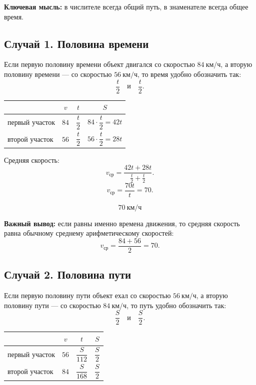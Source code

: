 \documentclass[a4paper,12pt]{article}
\newcommand{\important}[1]{\textcolor{darkaccent}{\textbf{#1}}}
\newcommand{\kmh}{\text{км/ч}}
\begin{document}
\important{Ключевая мысль:} в числителе всегда общий путь, в знаменателе всегда общее время.

\subsection{Случай 1. Половина времени}

Если первую половину времени объект двигался со скоростью $84\ \kmh$, а вторую половину времени --- со скоростью $56\ \kmh$, то время удобно обозначить так:
\[
\frac{t}{2} \quad \text{и} \quad \frac{t}{2}.
\]

\begin{center}
\renewcommand{\arraystretch}{1.35}
\begin{tabularx}{0.82\linewidth}{X c c c}
\toprule
 & $v$ & $t$ & $S$ \\
\midrule
первый участок & $84$ & $\dfrac{t}{2}$ & $84\cdot\dfrac{t}{2}=42t$ \\
второй участок & $56$ & $\dfrac{t}{2}$ & $56\cdot\dfrac{t}{2}=28t$ \\
\bottomrule
\end{tabularx}
\end{center}

Средняя скорость:
\[
v_{\text{ср}}=\frac{42t+28t}{\frac{t}{2}+\frac{t}{2}}.
\]
\[
v_{\text{ср}}=\frac{70t}{t}=70.
\]

\[
\boxed{70\ \kmh}
\]

\important{Важный вывод:} если равны именно времена движения, то средняя скорость равна обычному среднему арифметическому скоростей:
\[
v_{\text{ср}}=\frac{84+56}{2}=70.
\]

\subsection{Случай 2. Половина пути}

Если первую половину пути объект ехал со скоростью $56\ \kmh$, а вторую половину пути --- со скоростью $84\ \kmh$, то путь удобно обозначить так:
\[
\frac{S}{2} \quad \text{и} \quad \frac{S}{2}.
\]

\begin{center}
\renewcommand{\arraystretch}{1.35}
\begin{tabularx}{0.82\linewidth}{X c c c}
\toprule
 & $v$ & $t$ & $S$ \\
\midrule
первый участок & $56$ & $\dfrac{S}{112}$ & $\dfrac{S}{2}$ \\
второй участок & $84$ & $\dfrac{S}{168}$ & $\dfrac{S}{2}$ \\
\bottomrule
\end{tabularx}
\end{center}
\end{document}
